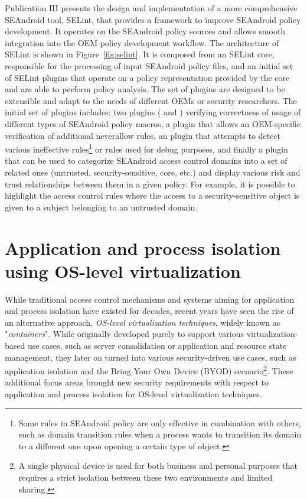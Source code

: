 Publication III presents the design and implementation of a more comprehensive SEAndroid tool, SELint, that provides a framework to improve SEAndroid policy development. It operates on the SEAndroid policy sources and allows smooth integration into the OEM policy development workflow. The architecture of SELint is shown in Figure~\ref{fig:selint}. It is composed from an SELint core, responsible for the processing of input SEAndroid policy files, and an initial set of SELint plugins that operate on a policy representation provided by the core and are able to perform policy analysis. The set of plugins are designed to be extensible and adapt to the needs of different OEMs or security researchers. The initial set of plugins includes: two plugins ( and ) verifying correctness of usage of different types of SEAndroid policy macros, a  plugin that allows an OEM-specific verification of additional neverallow rules, an  plugin that attempts to detect various ineffective rules\footnote{Some rules in SEAndroid policy are only effective in combination with others, such as domain transition rules when a process wants to transition its domain to a different one upon opening a certain type of object.} or rules used for debug purposes, and finally a  plugin that can be used to categorize SEAndroid access control domains into a set of related ones (untrusted, security-sensitive, core, etc.) and display various risk and trust relationships between them in a given policy. For example, it is possible to highlight the access control rules where the access to a security-sensitive object is given to a subject belonging to an untrusted domain.


\section{Application and process isolation using OS-level virtualization}
\label{sec:os-virt}

While traditional access control mechanisms and systems aiming for application and process isolation have existed for decades, recent years have seen the rise of an alternative approach, \textit{OS-level virtualization techniques}, widely known as "\textit{containers}". While originally developed purely to support various virtualization-based use cases, such as server consolidation or application and resource state management, they later on turned into various security-driven use cases, such as application isolation and the Bring Your Own Device (BYOD) scenario\footnote{A single physical device is used for both business and personal purposes that requires a strict isolation between these two environments and limited sharing.}. These additional focus areas brought new security requirements with respect to application and process isolation for OS-level virtualization techniques.

